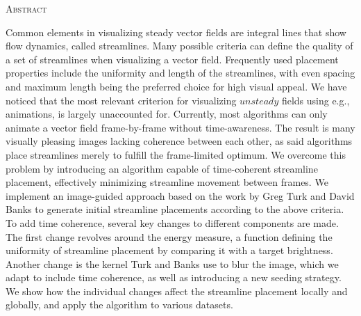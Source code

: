
\begin{center}
  \textsc{Abstract}
\end{center}
\noindent
Common elements in visualizing steady vector fields are integral lines that show flow dynamics, called streamlines.
Many possible criteria can define the quality of a set of streamlines when visualizing a vector field.
Frequently used placement properties include the uniformity and length of the streamlines, with even spacing and maximum length being the preferred choice for high visual appeal.
We have noticed that the most relevant criterion for visualizing $unsteady$ fields using e.g.,
animations, is largely unaccounted for.
Currently, most algorithms can only animate a vector field frame-by-frame without time-awareness.
The result is many visually pleasing images lacking coherence between each other,
as said algorithms place streamlines merely to fulfill the frame-limited optimum.
We overcome this problem by introducing an algorithm capable of time-coherent streamline placement,
effectively minimizing streamline movement between frames.
We implement an image-guided approach based on the work by Greg Turk and David Banks \cite{TurkBanks} to
generate initial streamline placements according to the above criteria.
To add time coherence, several key changes to different components are made.
The first change revolves around the energy measure, a function defining
the uniformity of streamline placement by comparing it with a target brightness.
Another change is the kernel Turk and Banks use to blur the image,
which we adapt to include time coherence, as well as introducing a new seeding strategy.
We show how the individual changes affect the streamline placement locally and globally,
and apply the algorithm to various datasets.
\cleardoublepage
